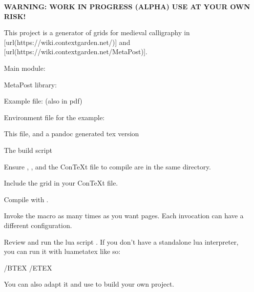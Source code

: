 \startsection[title={A Calligraphy Grid in ConTeXt/LMTX},reference={a-calligraphy-grid-in-contextlmtx}]

{\bf WARNING: WORK IN PROGRESS (ALPHA) USE AT YOUR OWN RISK!}

This project is a generator of grids for medieval calligraphy in [url(https://wiki.contextgarden.net/)] and [url(https://wiki.contextgarden.net/MetaPost)].

\startsubsection[title={Files},reference={files}]

\startitemize[packed]
\item
  Main module: 
\item
  MetaPost library: 
\item
  Example file:  (also in pdf)
\item
  Environment file for the example: 
\item
  This  file, and a pandoc generated tex version 
\item
  The build script 
\stopitemize

\stopsubsection

\startsubsection[title={Use},reference={use}]

\startenumerate[n,packed][stopper=.]
\item
  Ensure , , and the ConTeXt file to compile are in the same directory.
\item
  Include the grid in your ConTeXt file.
\item
  Compile with .
\item
  Invoke the \type{\Pauta} macro as many times as you want pages. Each invocation can have a different configuration.
\stopenumerate

\stopsubsection

\startsubsection[title={Generating the example file},reference={generating-the-example-file}]

Review and run the lua script . If you don't have a standalone lua interpreter, you can run it with luametatex like so:

\starthighlighting
/BTEX /ETEX
\stophighlighting

You can also adapt it and use to build your own project.

\stopsubsection

